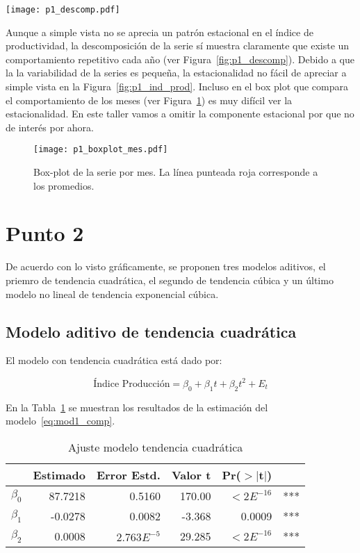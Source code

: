 \documentclass{tufte-handout}
\begin{document}
\begin{figure*}[!ht]
    \texttt{[image: p1\_descomp.pdf]}
    \caption{Descomposición de la serie de tiempo en sus componentes; tendencia ($T_t$), estacional ($S_t$) y error ($E_t$)}
    \label{fig:p1_descomp}
\end{figure*}

Aunque a simple vista no se aprecia un patrón estacional en el índice de productividad, la descomposición de la serie sí muestra claramente que existe un comportamiento repetitivo cada año (ver Figura~\ref{fig:p1_descomp}). Debido a que la la variabilidad de la series es pequeña, la estacionalidad no fácil de apreciar a simple vista en la Figura~\ref{fig:p1_ind_prod}. Incluso en el box plot que compara el comportamiento de los meses (ver Figura~\ref{fig:p1_boxplot_mes}) es muy difícil ver la estacionalidad. En este taller vamos a omitir la componente estacional por que no de interés por ahora.

\begin{figure}[!ht]
    \texttt{[image: p1\_boxplot\_mes.pdf]}
    \caption{Box-plot de la serie por mes. La línea punteada roja corresponde a los promedios.}
    \label{fig:p1_boxplot_mes}
\end{figure}


\pagebreak


\section*{Punto 2}

De acuerdo con lo visto gráficamente, se proponen tres modelos aditivos, el priemro de tendencia cuadrática, el segundo de tendencia cúbica y un último modelo no lineal de tendencia exponencial cúbica.

\subsection*{Modelo aditivo de tendencia cuadrática}

El modelo con tendencia cuadrática está dado por:

\begin{equation} \label{eq:mod1_comp}
	\text{Índice Producción} = \beta_0 + \beta_1 t + \beta_2 t^2 + E_t
\end{equation}

En la Tabla~\ref{tab:mod1_comp} se muestran los resultados de la estimación del modelo~\ref{eq:mod1_comp}.

\begin{table}[ht]
\centering
\begin{tabular}{lrrrrl}
            & Estimado & Error Estd. & Valor t & Pr($>$$|$t$|$) & \\ 
  \hline
  $\beta_0$ & 87.7218 & 0.5160 & 170.00 & $< 2E^{-16}$ & *** \\ 
  $\beta_1$ & -0.0278 & 0.0082 & -3.368 & 0.0009 & *** \\ 
  $\beta_2$ & 0.0008 & $2.763E^{-5}$ & 29.285 & $< 2E^{-16}$ & *** \\ 
   \hline
\end{tabular}
\caption{Ajuste modelo tendencia cuadrática} 
\label{tab:mod1_comp}
\end{table}
\end{document}
